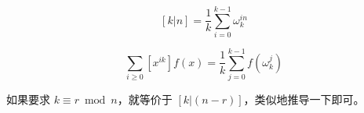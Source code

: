 $$ [k|n] = \frac{1}{k} \sum_{i = 0} ^ {k-1}\omega_k^{in} $$

$$ \sum_{i \ge 0} [x^{ik}]f(x) = \frac{1}{k}\sum_{j=0}^{k-1}f(\omega_{k}^j) $$

如果要求 $k \equiv r \bmod n$，就等价于 $\left[k | (n - r)\right]$，类似地推导一下即可。

